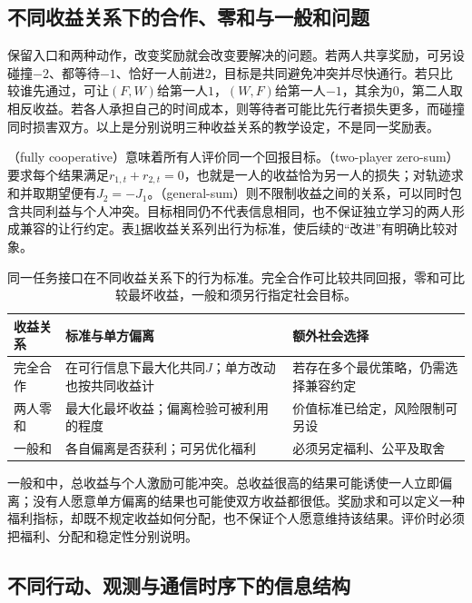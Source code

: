 \subsection{不同收益关系下的合作、零和与一般和问题}
\label{sec:rl-multi-agent-payoffs}

保留入口和两种动作，改变奖励就会改变要解决的问题。若两人共享奖励，可另设碰撞$-2$、都等待$-1$、恰好一人前进$2$，目标是共同避免冲突并尽快通行。若只比较谁先通过，可让$(F,W)$给第一人$1$，$(W,F)$给第一人$-1$，其余为$0$，第二人取相反收益。若各人承担自己的时间成本，则等待者可能比先行者损失更多，而碰撞同时损害双方。以上是分别说明三种收益关系的教学设定，不是同一奖励表。

（fully cooperative）意味着所有人评价同一个回报目标。（two-player zero-sum）要求每个结果满足$r_{1,t}+r_{2,t}=0$，也就是一人的收益恰为另一人的损失；对轨迹求和并取期望便有$J_2=-J_1$。（general-sum）则不限制收益之间的关系，可以同时包含共同利益与个人冲突。目标相同仍不代表信息相同，也不保证独立学习的两人形成兼容的让行约定。表\ref{tab:rl-multi-agent-payoffs}据收益关系列出行为标准，使后续的“改进”有明确比较对象。

\begin{table}[htbp]
 \centering
 \begin{tabularx}{\linewidth}{@{}l >{\raggedright\arraybackslash}X >{\raggedright\arraybackslash}X@{}}
 \toprule
 收益关系 & 标准与单方偏离 & 额外社会选择\\
 \midrule
 完全合作 & 在可行信息下最大化共同$J$；单方改动也按共同收益计 & 若存在多个最优策略，仍需选择兼容约定\\
 两人零和 & 最大化最坏收益；偏离检验可被利用的程度 & 价值标准已给定，风险限制可另设\\
 一般和 & 各自偏离是否获利；可另优化福利 & 必须另定福利、公平及取舍\\
 \bottomrule
 \end{tabularx}
 \caption{同一任务接口在不同收益关系下的行为标准。完全合作可比较共同回报，零和可比较最坏收益，一般和须另行指定社会目标。}
 \label{tab:rl-multi-agent-payoffs}
\end{table}

一般和中，总收益与个人激励可能冲突。总收益很高的结果可能诱使一人立即偏离；没有人愿意单方偏离的结果也可能使双方收益都很低。奖励求和可以定义一种福利指标，却既不规定收益如何分配，也不保证个人愿意维持该结果。评价时必须把福利、分配和稳定性分别说明。

\subsection{不同行动、观测与通信时序下的信息结构}
\label{sec:rl-multi-agent-information}

